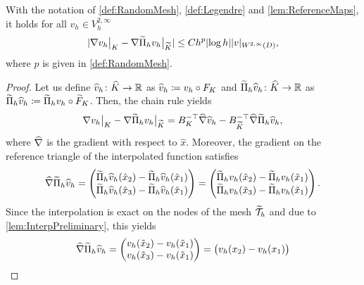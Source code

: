 \documentclass[10pt]{article}
\begin{document}
\begin{lemma}\label{lem:Interp_BoundKKTilde} With the notation of \cref{def:RandomMesh}, \cref{def:Legendre} and \cref{lem:ReferenceMaps}, it holds for all $v_h \in V_h^{2, \infty}$
	\begin{equation}
		\lvert\nabla v_h\bigr\rvert_{K} - \nabla \widetilde \Pi_h v_h \bigr\rvert_{\widetilde K}\rvert \leq C h^p \lvert\log h\rvert \lvert v\rvert_{W^{2, \infty}(D)},
	\end{equation}
	where $p$ is given in \cref{def:RandomMesh}.
\end{lemma}
\begin{proof} Let us define $\widehat v_h \colon \widehat K \to \mathbb{R}$ as $\widehat v_h \coloneqq v_h \circ F_K$ and $\widetilde \Pi_h \widehat v_h\colon \widehat K \to \mathbb{R}$ as $\widetilde \Pi_h \widehat v_h \coloneqq \widetilde \Pi_h v_h \circ \widetilde F_K$. Then, the chain rule yields
\begin{equation}\label{eq:DiffMapToRef}
	\nabla v_h\bigr\rvert_{K} - \nabla \widetilde \Pi_h v_h \bigr\rvert_{\widetilde K} = B_K^{-\top} \widehat \nabla \widehat v_h - B_{\widetilde K}^{-\top} \widehat \nabla \widetilde \Pi_h \widehat v_h,
\end{equation}
where $\widehat \nabla$ is the gradient with respect to $\hat x$. Moreover, the gradient on the reference triangle of the interpolated function satisfies
\begin{equation}
	\widehat\nabla \widetilde \Pi_h \widehat v_h = \begin{pmatrix} \widetilde \Pi_h \widehat v_h(\hat x_2) - \widetilde \Pi_h \widehat v_h(\hat x_1) \\
													 \widetilde \Pi_h \widehat v_h(\hat x_3) - \widetilde \Pi_h \widehat v_h(\hat x_1) \end{pmatrix}
								   = \begin{pmatrix} \widetilde \Pi_h v_h(\tilde x_2) - \widetilde \Pi_h v_h(\tilde x_1) \\
								   					 \widetilde \Pi_h v_h(\tilde x_3) - \widetilde \Pi_h v_h(\tilde x_1) \end{pmatrix}.
\end{equation}
Since the interpolation is exact on the nodes of the mesh $\widetilde{\mathcal T}_h$ and due to \cref{lem:InterpPreliminary}, this yields
\begin{equation}
	\widehat\nabla \widetilde \Pi_h \widehat v_h = \begin{pmatrix} v_h(\tilde x_2) - v_h(\tilde x_1) \\
													 v_h(\tilde x_3) - v_h(\tilde x_1) \end{pmatrix}
								   = \begin{pmatrix} v_h(x_2) - v_h(x_1) \\

\end{pmatrix}
\end{equation}
\end{proof}
\end{document}
